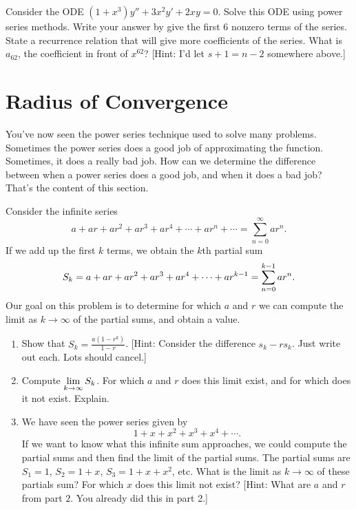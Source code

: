 \begin{problem}
 Consider the ODE $(1+x^3)y''+3x^2y'+2xy=0$. Solve this ODE using power series methods. Write your answer by give the first 6 nonzero terms of the series. State a recurrence relation that will give more coefficients of the series. What is $a_{62}$, the coefficient in front of $x^{62}$?
[Hint: I'd let $s+1=n-2$ somewhere above.]
\end{problem}



\section{Radius of Convergence}
You've now seen the power series technique used to solve many problems.  Sometimes the power series does a good job of approximating the function.  Sometimes, it does a really bad job. How can we determine the difference between when a power series does a good job, and when it does a bad job?  That's the content of this section.

\begin{problem}
 Consider the infinite series 
$$a+ar+ar^2+ar^3+ar^4+\cdots +ar^n+\cdots = \sum_{n=0}^\infty ar^n.$$
If we add up the first $k$ terms, we obtain the $k$th partial sum 
$$\displaystyle S_k = a+ar+ar^2+ar^3+ar^4+\cdots +ar^{k-1} = \sum_{n=0}^{k-1}ar^n.$$
Our goal on this problem is to determine for which $a$ and $r$ we can compute the limit as $k\to \infty$ of the partial sums, and obtain a value.  
\begin{enumerate}
 \item Show that $S_k = \frac{a(1-r^k)}{1-r}$. [Hint: Consider the difference $s_k-rs_k$. Just write out each. Lots should cancel.]
 \item Compute $\displaystyle\lim_{k\to\infty}S_k$.  For which $a$ and $r$ does this limit exist, and for which does it not exist. Explain.
 \item We have seen the power series given by  
$$1+x+x^2+x^3+x^4+\cdots.$$
 If we want to know what this infinite sum approaches, we could compute the partial sums and then find the limit of the partial sums.  The partial sums are $S_1=1$, $S_2=1+x$, $S_3=1+x+x^2$, etc. What is the limit as $k\to\infty$ of these partials sum? For which $x$ does this limit not exist? [Hint: What are $a$ and $r$ from part $2$. You already did this in part 2.]
\end{enumerate}

\end{problem}


